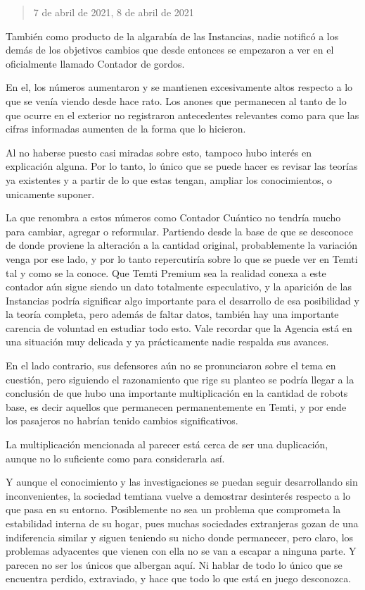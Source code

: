 \documentclass[
]{book}
\begin{document}
\begin{quote}
7 de abril de 2021, 8 de abril de 2021
\end{quote}

También como producto de la algarabía de las Instancias, nadie notificó a los demás de los objetivos cambios que desde entonces se empezaron a ver en el oficialmente llamado Contador de gordos.

En el, los números aumentaron y se mantienen excesivamente altos respecto a lo que se venía viendo desde hace rato. Los anones que permanecen al tanto de lo que ocurre en el exterior no registraron antecedentes relevantes como para que las cifras informadas aumenten de la forma que lo hicieron.

Al no haberse puesto casi miradas sobre esto, tampoco hubo interés en explicación alguna. Por lo tanto, lo único que se puede hacer es revisar las teorías ya existentes y a partir de lo que estas tengan, ampliar los conocimientos, o unicamente suponer.

La que renombra a estos números como Contador Cuántico no tendría mucho para cambiar, agregar o reformular. Partiendo desde la base de que se desconoce de donde proviene la alteración a la cantidad original, probablemente la variación venga por ese lado, y por lo tanto repercutiría sobre lo que se puede ver en Temti tal y como se la conoce. Que Temti Premium sea la realidad conexa a este contador aún sigue siendo un dato totalmente especulativo, y la aparición de las Instancias podría significar algo importante para el desarrollo de esa posibilidad y la teoría completa, pero además de faltar datos, también hay una importante carencia de voluntad en estudiar todo esto. Vale recordar que la Agencia está en una situación muy delicada y ya prácticamente nadie respalda sus avances.

En el lado contrario, sus defensores aún no se pronunciaron sobre el tema en cuestión, pero siguiendo el razonamiento que rige su planteo se podría llegar a la conclusión de que hubo una importante multiplicación en la cantidad de robots base, es decir aquellos que permanecen permanentemente en Temti, y por ende los pasajeros no habrían tenido cambios significativos.

La multiplicación mencionada al parecer está cerca de ser una duplicación, aunque no lo suficiente como para considerarla así.

Y aunque el conocimiento y las investigaciones se puedan seguir desarrollando sin inconvenientes, la sociedad temtiana vuelve a demostrar desinterés respecto a lo que pasa en su entorno. Posiblemente no sea un problema que comprometa la estabilidad interna de su hogar, pues muchas sociedades extranjeras gozan de una indiferencia similar y siguen teniendo su nicho donde permanecer, pero claro, los problemas adyacentes que vienen con ella no se van a escapar a ninguna parte. Y parecen no ser los únicos que albergan aquí. Ni hablar de todo lo único que se encuentra perdido, extraviado, y hace que todo lo que está en juego desconozca.
\end{document}
